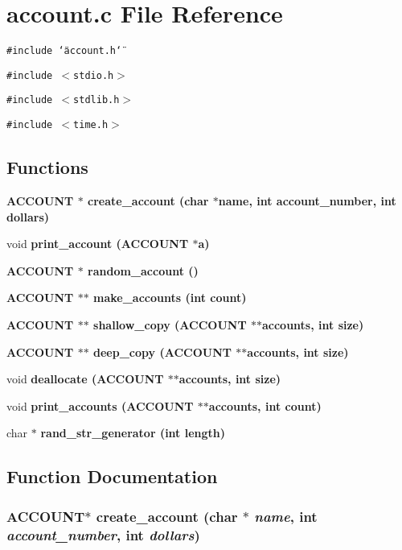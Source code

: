 \section{account.c File Reference}
\label{account_8c}
{\tt \#include \char`\"{}account.h\char`\"{}}\par
{\tt \#include $<$stdio.h$>$}\par
{\tt \#include $<$stdlib.h$>$}\par
{\tt \#include $<$time.h$>$}\par
\subsection*{Functions}
\begin{CompactItemize}
\item 
\bf{ACCOUNT} $\ast$ \bf{create\_\-account} (char $\ast$name, int account\_\-number, int dollars)
\item 
void \bf{print\_\-account} (\bf{ACCOUNT} $\ast$a)
\item 
\bf{ACCOUNT} $\ast$ \bf{random\_\-account} ()
\item 
\bf{ACCOUNT} $\ast$$\ast$ \bf{make\_\-accounts} (int count)
\item 
\bf{ACCOUNT} $\ast$$\ast$ \bf{shallow\_\-copy} (\bf{ACCOUNT} $\ast$$\ast$accounts, int size)
\item 
\bf{ACCOUNT} $\ast$$\ast$ \bf{deep\_\-copy} (\bf{ACCOUNT} $\ast$$\ast$accounts, int size)
\item 
void \bf{deallocate} (\bf{ACCOUNT} $\ast$$\ast$accounts, int size)
\item 
void \bf{print\_\-accounts} (\bf{ACCOUNT} $\ast$$\ast$accounts, int count)
\item 
char $\ast$ \bf{rand\_\-str\_\-generator} (int length)
\end{CompactItemize}


\subsection{Function Documentation}
\subsubsection{\setlength{\rightskip}{0pt plus 5cm}\bf{ACCOUNT}$\ast$ create\_\-account (char $\ast$ {\em name}, int {\em account\_\-number}, int {\em dollars})}\label{account_8c_a56cfd85c8adc177bc126f9ffb5e5451}


